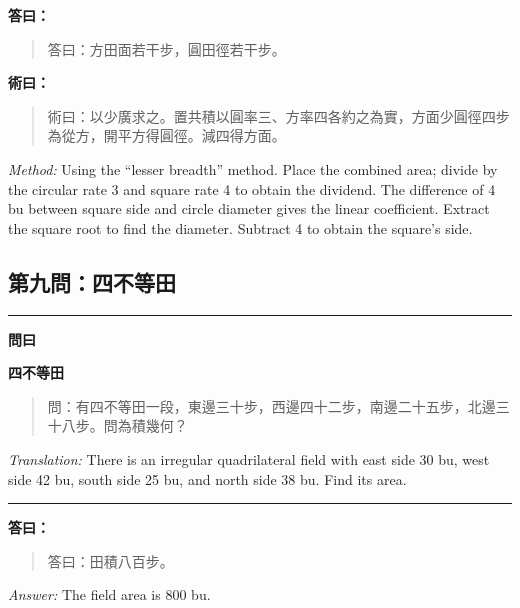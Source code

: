 \documentclass[11pt,a4paper]{article}
\newenvironment{problem}[1][]{%
  \medskip\noindent\rule{\textwidth}{0.4pt}%
  \par\noindent\textbf{\color{sectioncolor}#1}\par\nopagebreak%
  \smallskip%
}{%
  \par\noindent\rule{\textwidth}{0.4pt}\medskip%
}
\newenvironment{answer}{%
  \medskip\noindent{\color{answercolor}\rule{0.5\textwidth}{0.5pt}}%
  \par\color{answercolor}%
}{%
  \par\medskip%
}
\newenvironment{method}{%
  \medskip\noindent{\color{methodcolor}\rule{0.5\textwidth}{0.5pt}}%
  \par\color{methodcolor}%
}{%
  \par\medskip%
}
\begin{document}
\begin{answer}
\textbf{答曰：}

\begin{quote}
\textcolor{chinacolor}{%
答曰：方田面若干步，圓田徑若干步。
}
\end{quote}
\end{answer}

\begin{method}
\textbf{術曰：}

\begin{quote}
\textcolor{chinacolor}{%
術曰：以少廣求之。置共積以圓率三、方率四各約之為實，方面少圓徑四步為從方，開平方得圓徑。減四得方面。
}
\end{quote}

\textit{Method:} Using the ``lesser breadth'' method. Place the combined 
area; divide by the circular rate 3 and square rate 4 to obtain the 
dividend. The difference of 4 bu between square side and circle diameter 
gives the linear coefficient. Extract the square root to find the diameter. 
Subtract 4 to obtain the square's side.
\end{method}

\subsection*{第九問：四不等田}

\begin{problem}[\textbf{問曰}]
\textbf{\color{sectioncolor}四不等田}

\begin{quote}
\textcolor{chinacolor}{%
問：有四不等田一段，東邊三十步，西邊四十二步，南邊二十五步，北邊三十八步。問為積幾何？
}
\end{quote}

\textit{Translation:} There is an irregular quadrilateral field with east 
side 30 bu, west side 42 bu, south side 25 bu, and north side 38 bu. 
Find its area.
\end{problem}

\begin{answer}
\textbf{答曰：}

\begin{quote}
\textcolor{chinacolor}{%
答曰：田積八百步。
}
\end{quote}

\textit{Answer:} The field area is 800 bu.
\end{answer}
\end{document}
